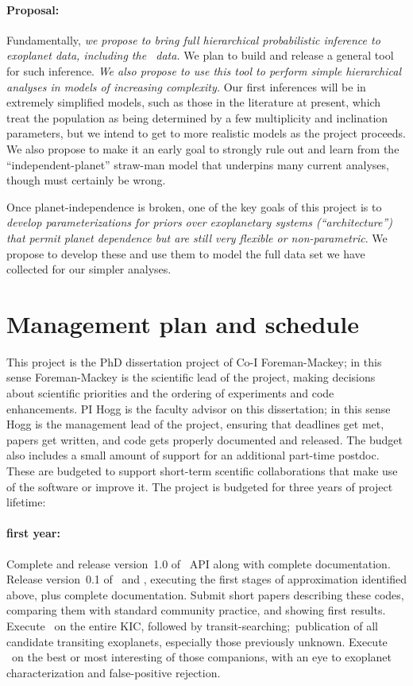 \documentclass[letterpaper,12pt,preprint]{hack_aastex}
\newcommand{\kplr}{\package{kplr}}
\newcommand{\Untrendy}{\package{Untrendy}}
\newcommand{\Bart}{\package{Bart}}
\begin{document}
\paragraph{Proposal:}
Fundamentally, \emph{we propose to bring full hierarchical
  probabilistic inference to exoplanet data, including the
  \Kepler\ data.}  We plan to build and release a general tool for
such inference.  \emph{We also propose to use this tool to perform
  simple hierarchical analyses in models of increasing complexity.}
Our first inferences will be in extremely simplified models, such as
those in the literature at present, which treat the population as
being determined by a few multiplicity and inclination parameters, but
we intend to get to more realistic models as the project proceeds.  We
also propose to make it an early goal to strongly rule out and learn
from the ``independent-planet'' straw-man model that underpins many
current analyses, though must certainly be wrong.

Once planet-independence is broken, one of the key goals of this
project is to \emph{develop parameterizations for priors over
  exoplanetary systems (``architecture'') that permit planet
  dependence but are still very flexible or non-parametric}.  We
propose to develop these and use them to model the full data set we
have collected for our simpler analyses.


\section{Management plan and schedule}

This project is the PhD dissertation project of Co-I Foreman-Mackey;
in this sense Foreman-Mackey is the scientific lead of the project,
making decisions about scientific priorities and the ordering of
experiments and code enhancements.  PI Hogg is the faculty advisor on
this dissertation; in this sense Hogg is the management lead of the
project, ensuring that deadlines get met, papers get written, and code
gets properly documented and released.  The budget also includes a
small amount of support for an additional part-time
postdoc.  These are budgeted to support short-term scentific
collaborations that make use of the software or improve it.
The project is budgeted for three years of project lifetime:

\paragraph{first year:}
Complete and release version~1.0 of \kplr\ API along with complete
documentation.
Release version~0.1
of \Untrendy\ and \Bart, executing the first stages of
approximation identified above, plus complete documentation.  Submit short
papers describing these codes, comparing them with standard community
practice, and showing first results.
Execute \Untrendy\ on the entire KIC, followed by transit-searching;\
publication of all candidate transiting exoplanets, especially those
previously unknown.  Execute \Bart\ on the best or most interesting of
those companions, with an eye to exoplanet characterization and
false-positive rejection.
\end{document}
